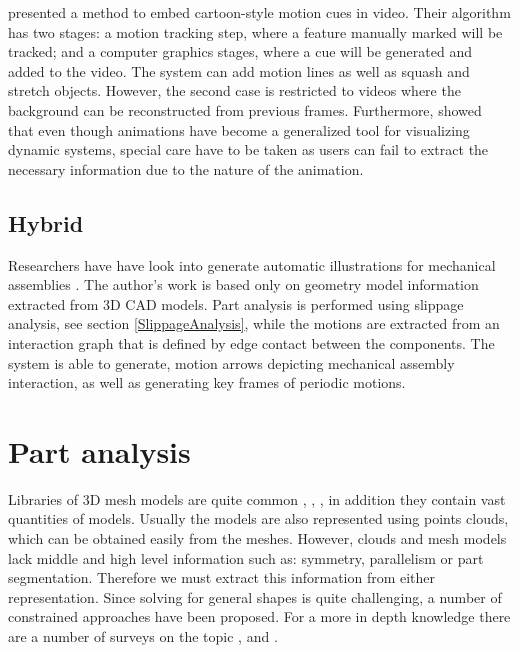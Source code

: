 \cite{Collomosse2005} presented a method to embed cartoon-style motion cues in video.
Their algorithm has two stages: a motion tracking step, where a feature manually marked will be tracked; and a computer graphics stages, where a cue will be generated and added to the video.
The system can add motion lines as well as squash and stretch objects.
However, the second case is restricted to videos where the background can be reconstructed from previous frames.
Furthermore, \cite{Lowe2014} showed that even though animations have become a generalized tool for visualizing dynamic systems, special care have to be taken as users can fail to extract the necessary information due to the nature of the animation.

\subsection{Hybrid}

Researchers have have look into generate automatic illustrations for mechanical assemblies \cite{Mitra2010}.
The author's work is based only on geometry model information extracted from 3D CAD models.
Part analysis is performed using slippage analysis, see section \ref{SlippageAnalysis}, while the motions are extracted from an interaction graph that is defined by edge contact between the components.
The system is able to generate, motion arrows depicting mechanical assembly interaction, as well as generating key frames of periodic motions.

\section{Part analysis}

Libraries of 3D mesh models are quite common \cite{Trimble2014}, \cite{GrabCAD2014}, \cite{Autodesk2014}, in addition they contain vast quantities of models.   
Usually the models are also represented using points clouds, which can be obtained easily from the meshes.
However, clouds and mesh models lack middle and high level information such as: symmetry, parallelism or part segmentation.
Therefore we must extract this information from either representation.
Since solving for general shapes is quite challenging, a number of constrained approaches have been proposed.
For a more in depth knowledge there are a number of surveys on the topic \cite{Varady1997}, \cite{Agathos2007} and \cite{Shamir2008}.\\

